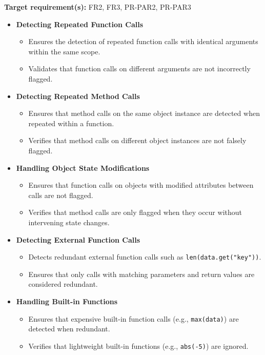 \documentclass[12pt, titlepage]{article}
\begin{document}
\noindent \textbf{Target requirement(s):} FR2, FR3, PR-PAR2, PR-PAR3~\cite{SRS} \\

\begin{itemize}
    \item \textbf{Detecting Repeated Function Calls}
    \begin{itemize}
        \item Ensures the detection of repeated function calls with identical arguments within the same scope.
        \item Validates that function calls on different arguments are not incorrectly flagged.
    \end{itemize}

    \item \textbf{Detecting Repeated Method Calls}
    \begin{itemize}
        \item Ensures that method calls on the same object instance are detected when repeated within a function.
        \item Verifies that method calls on different object instances are not falsely flagged.
    \end{itemize}

    \item \textbf{Handling Object State Modifications}
    \begin{itemize}
        \item Ensures that function calls on objects with modified attributes between calls are not flagged.
        \item Verifies that method calls are only flagged when they occur without intervening state changes.
    \end{itemize}

    \item \textbf{Detecting External Function Calls}
    \begin{itemize}
        \item Detects redundant external function calls such as \texttt{len(data.get("key"))}.
        \item Ensures that only calls with matching parameters and return values are considered redundant.
    \end{itemize}

    \item \textbf{Handling Built-in Functions}
    \begin{itemize}
        \item Ensures that expensive built-in function calls (e.g., \texttt{max(data)}) are detected when redundant.
        \item Verifies that lightweight built-in functions (e.g., \texttt{abs(-5)}) are ignored.
    \end{itemize}


\end{itemize}
\end{document}
